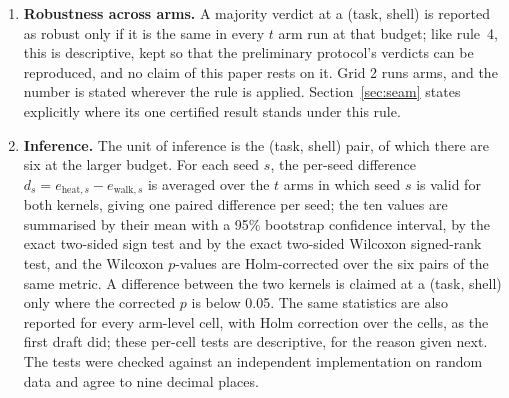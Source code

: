 \documentclass[preprint,11pt,3p]{elsarticle}
\begin{document}
\begin{enumerate}
  spectral operators and $e_{\mathrm{op},s}$ the MAE of seed $s$, the heat kernel wins the
  majority if
  \begin{equation}
  \bar{e}_{\mathrm{heat}} < \bar{e}_{\mathrm{walk}}
  \quad\text{and}\quad
  \bigl|\{ s \in S : e_{\mathrm{heat},s} < e_{\mathrm{walk},s} \}\bigr| \geq 7,
  \label{eq:win}
  \end{equation}
  and symmetrically for the walk kernel; otherwise the cell is a tie, and fewer than seven valid
  seed pairs leaves it undecided. This is the rule of the preliminary protocol, and it is kept so
  that the preliminary verdicts can be reproduced. Its operating characteristics are the point:
  under the null of exchangeable operators, $P(X\geq 7 \mid n=10, p=\tfrac12) = 0.172$, so a
  winner is declared in 34.4\% of null cells, and the two-sided sign-test $p$-values behind a
  7:3, 8:2 and 8:1 majority are 0.344, 0.109 and 0.039. A majority verdict is therefore reported
  beside, never instead of, the tests of rule~6, and every table that prints a verdict also
  prints which operator led in mean, so that a ``tie'' cannot hide a lead.
\item \textbf{Robustness across arms.} A majority verdict at a (task, shell) is reported as
  robust only if it is the same in every $t$ arm run at that budget; like rule~4, this is
  descriptive, kept so that the preliminary protocol's verdicts can be reproduced, and no claim
  of this paper rests on it. Grid 2 runs \numGridThreeArms{} arms, and the number is stated
  wherever the rule is applied. Section~\ref{sec:seam} states explicitly where its one certified
  result stands under this rule.
\item \textbf{Inference.} The unit of inference is the (task, shell) pair, of which there are
  six at the larger budget. For each seed $s$, the per-seed difference
  $d_{s}=e_{\mathrm{heat},s}-e_{\mathrm{walk},s}$ is averaged over the $t$ arms in which seed $s$
  is valid for both kernels, giving one paired difference per seed; the ten values are summarised
  by their mean with a 95\% bootstrap confidence interval, by the exact two-sided sign test and by
  the exact two-sided Wilcoxon signed-rank test, and the Wilcoxon $p$-values are Holm-corrected
  over the six pairs of the same metric. A difference between the two kernels is claimed at a
  (task, shell) only where the corrected $p$ is below 0.05. The same statistics are also reported
  for every arm-level cell, with Holm correction over the \numGthreeArmCells{} cells, as the
  first draft did; these per-cell tests are descriptive, for the reason given next. The tests were
  checked against an independent implementation on random data and agree to nine decimal places.
\end{enumerate}
\end{document}
